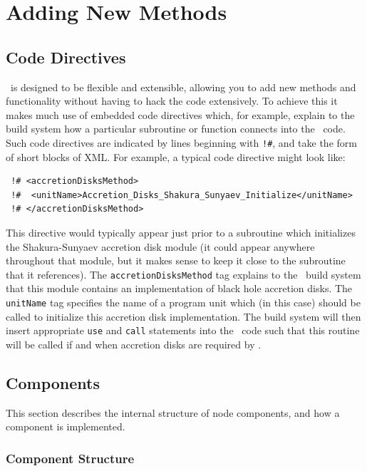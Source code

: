 \chapter{Adding New Methods}

\section{Code Directives}\label{sec:CodeDirectives}

\glc\ is designed to be flexible and extensible, allowing you to add new methods and functionality without having to hack the code extensively. To achieve this it makes much use of embedded code directives which, for example, explain to the build system how a particular subroutine or function connects into the \glc\ code. Such code directives are indicated by lines beginning with {\tt !\#}, and take the form of short blocks of XML. For example, a typical code directive might look like:
\begin{verbatim}
 !# <accretionDisksMethod>
 !#  <unitName>Accretion_Disks_Shakura_Sunyaev_Initialize</unitName>
 !# </accretionDisksMethod>
\end{verbatim}
This directive would typically appear just prior to a subroutine which initializes the Shakura-Sunyaev accretion disk module (it could appear anywhere throughout that module, but it makes sense to keep it close to the subroutine that it references). The {\tt accretionDisksMethod} tag explains to the \glc\ build system that this module contains an implementation of black hole accretion disks. The {\tt unitName} tag specifies the name of a program unit which (in this case) should be called to initialize this accretion disk implementation. The build system will then insert appropriate {\tt use} and {\tt call} statements into the \glc\ code such that this routine will be called if and when accretion disks are required by \glc.

\section{Components}

This section describes the internal structure of node components, and how a component is implemented.

\subsection{Component Structure}


